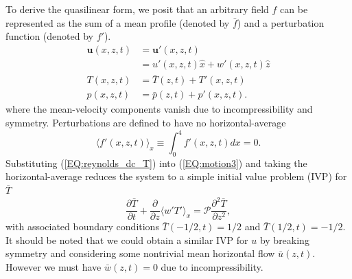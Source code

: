 \documentclass[reprint,amsmath,amssymb,aps]{revtex4-1}
\renewcommand{\vec}[1]{\boldsymbol{#1}}
\newcommand{\eq}[1]{(\ref{#1})}
\begin{document}
To derive the quasilinear form, we posit that an arbitrary field $f$ can be represented as the sum of a mean profile (denoted by $\bar{f}$) and a perturbation function (denoted by $f'$).
\begin{align}
    \vec{u}(x, z, t) &= \vec{u'}(x, z, t) \label{EQ:reynolds_dc_u}\\
    &= u'(x, z, t)\hat{x} + w'(x, z, t)\hat{z} \\
    T(x, z, t) &= \bar{T}(z, t) + T'(x, z, t) \label{EQ:reynolds_dc_T}\\
    p(x, z, t) &= \bar{p}(z, t) +  p'(x, z, t) \label{EQ:reynolds_dc_p}.
\end{align}
where the mean-velocity components vanish due to incompressibility and symmetry. Perturbations are defined to have no horizontal-average
\begin{equation}
    \langle f'(x, z, t) \rangle_x \equiv \int_{0}^4 f'(x, z, t) dx = 0.
\end{equation}
Substituting \eq{EQ:reynolds_dc_T} into \eq{EQ:motion3} and taking the horizontal-average reduces the system to a simple initial value problem (IVP) for $\bar{T}$
\begin{equation}
  \frac{\partial \bar{T}}{\partial t} + \frac{\partial}{\partial z} \langle w'T' \rangle_x = \mathcal{P} \frac{\partial^2 \bar{T}}{\partial z^2}, \label{EQ:T0_IVP}
\end{equation}
with associated boundary conditions $\bar{T}(-1/2, t) = 1/2$ and $\bar{T}(1/2, t) = -1/2$. It should be noted that we could obtain a similar IVP for $u$ by breaking symmetry and considering some nontrivial mean horizontal flow $\bar{u}(z, t)$. However we must have $\bar{w}(z, t) = 0$ due to incompressibility.
\end{document}
